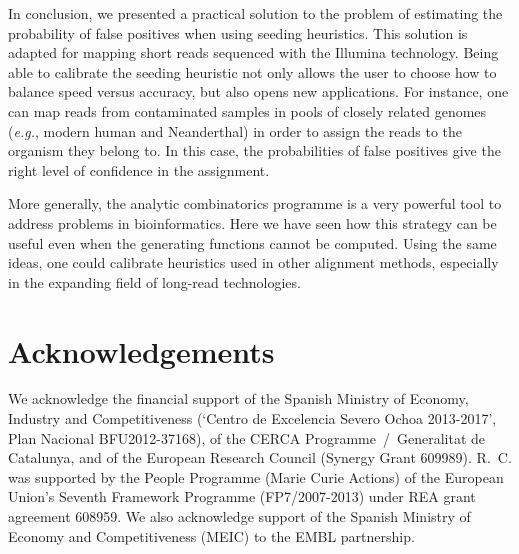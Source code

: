 \documentclass{article}
\begin{document}
In conclusion, we presented a practical solution to the problem of
estimating the probability of false positives when using seeding
heuristics. This solution is adapted for mapping short reads sequenced
with the Illumina technology. Being able to calibrate the seeding
heuristic not only allows the user to choose how to balance speed versus
accuracy, but also opens new applications. For instance, one can map reads
from contaminated samples in pools of closely related genomes
(\textit{e.g.}, modern human and Neanderthal) in order to assign the reads
to the organism they belong to. In this case, the probabilities of false
positives give the right level of confidence in the assignment.

More generally, the analytic combinatorics programme is a very powerful
tool to address problems in bioinformatics. Here we have seen how this
strategy can be useful even when the generating functions cannot be
computed. Using the same ideas, one could calibrate heuristics used in
other alignment methods, especially in the expanding field of long-read
technologies.


\section*{Acknowledgements}

We acknowledge the financial support of the Spanish Ministry of Economy,
Industry and Competitiveness (`Centro de Excelencia Severo Ochoa
2013-2017', Plan Nacional BFU2012-37168), of the CERCA
Programme~/~Generalitat de Catalunya, and of the European Research Council
(Synergy Grant 609989). R.~C. was supported by the People Programme
(Marie Curie Actions) of the European Union's Seventh Framework Programme
(FP7/2007-2013) under REA grant agreement 608959. We also acknowledge
support of the Spanish Ministry of Economy and Competitiveness (MEIC) to
the EMBL partnership.





\end{document}

